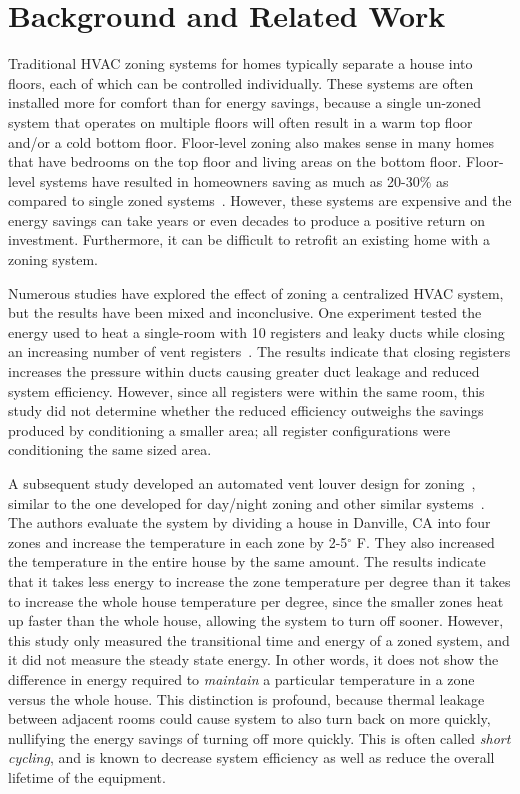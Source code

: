 \section{Background and Related Work}
\label{sec:relatedWork}

Traditional HVAC zoning systems for homes typically separate a house into
floors, each of which can be controlled individually.  These systems are often
installed more for comfort than for energy savings, because a single un-zoned
system that operates on multiple floors will often result in a warm top floor
and/or a cold bottom floor.  Floor-level zoning also makes sense in many homes
that have bedrooms on the top floor and living areas on the bottom floor.
Floor-level systems have resulted in homeowners saving as much as 20-30\% as
compared to single zoned systems~\cite{Systems2003}. However, these systems are
expensive and the energy savings can take years or even decades to produce a
positive return on investment.  Furthermore, it can be difficult to retrofit an
existing home with a zoning system.

Numerous studies have explored the effect of zoning a centralized HVAC system,
but the results have been mixed and inconclusive.  One experiment tested the
energy used to heat a single-room with 10 registers and leaky ducts while
closing an increasing number of vent registers~\cite{walker2003register}.  The
results indicate that closing registers increases the pressure within ducts
causing greater duct leakage and reduced system efficiency.  However, since all
registers were within the same room, this study did not determine whether the
reduced efficiency outweighs the savings produced by conditioning a smaller
area; all register configurations were conditioning the same sized area.

A subsequent study developed an automated vent louver design for
zoning~\cite{watts2007application}, similar to the one developed for
day/night zoning and other similar systems~\cite{redfern2006design}.  The
authors evaluate the system by dividing a house in Danville, CA into four zones
and increase the temperature in each zone by 2-5$^\circ$ F. They also increased
the temperature in the entire house by the same amount.  The results indicate
that it takes less energy to increase the zone temperature per degree than it
takes to increase the whole house temperature per degree, since the smaller
zones heat up faster than the whole house, allowing the system to turn off
sooner.  However, this study only measured the transitional time and energy of a
zoned system, and it did not measure the steady state energy.  In other
words, it does not show the difference in energy required to {\em maintain} a
particular temperature in a zone versus the whole house.  This distinction is
profound, because thermal leakage between adjacent rooms could cause system to
also turn back on more quickly, nullifying the energy savings of turning off
more quickly.  This is often called {\em short cycling}, and is known to
decrease system efficiency as well as reduce the overall lifetime of the
equipment.

